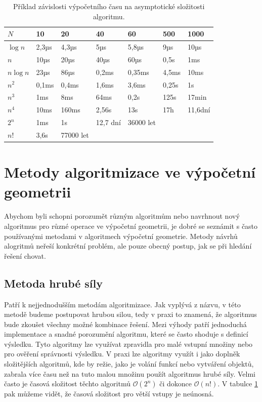 	
\begin{table}

\begin{tabular}{ |p{1.4cm}||p{1.6cm}|p{1.6cm}|p{1.6cm}|p{1.6cm}|p{1.6cm}|p{1.6cm}|  }
\hline

$N$				&10			&20			&40			&60			&500		&1000\\
\hline
$\log n$		&2,3µs		&4,3µs		&5µs		&5,8µs		&9µs		&10µs\\			
$n$				&10µs		&20µs		&40µs		&60µs		&0,5s		&1ms\\
$n \log n$		&23µs		&86µs		&0,2ms		&0,35ms		&4,5ms		&10ms\\
$n^2$			&0,1ms		&0,4ms		&1,6ms		&3,6ms		&0,25s		&1s\\
$n^3$			&1ms		&8ms		&64ms		&0,2s		&125s		&17min\\
$n^4$			&10ms		&160ms		&2,56s		&13s		&17h		&11,6dní\\
$2^n$			&1ms		&1s			&12,7 dní	&36000 let	&			&\\
$n!$			&3,6s		&77000 let	&			&			&			&\\
\hline

\end{tabular}
\caption{Příklad závislosti výpočetního času na asymptotické složitosti algoritmu.}
\label{tab:4-time_complexity}
\end{table}

\section{Metody algoritmizace ve výpočetní geometrii}
Abychom byli schopni porozumět různým algoritmům nebo navrhnout nový
algoritmus pro různé operace ve výpočetní geometrii, je dobré se
seznámit s často používanými metodami v algoritmech výpočetní
geometrie. Metody návrhů alogritmů neřeší konkrétní problém, ale pouze
obecný postup, jak se při hledání řešení chovat.

\subsection{Metoda hrubé síly}
Patří k nejjednodušším metodám algoritmizace. Jak vyplývá z názvu, v
této metodě budeme postupovat hrubou silou, tedy v praxi to znamená,
že algoritmus bude zkou\-šet všechny možné kombinace řešení. Mezi
výhody patří jednoduchá implementace a snadné porozumění algoritmu,
které se často shoduje s definicí výsledku. Tyto algoritmy lze
využívat zpravidla pro malé vstupní množiny nebo pro ověření
správnosti výsledku. V praxi lze algoritmy využít i jako doplněk
složitějších algoritmů, kde by režie, jako je volání funkcí nebo
vytváření objektů, zabrala více času než na tuto malou množinu použít
algoritmus hrubé síly. Velmi často je časová složitost těchto
algoritmů $\mathcal{O}(2^n)$ či dokonce $\mathcal{O}(n!)$. V tabulce
\ref{tab:4-time_complexity} pak můžeme vidět, že časová složitost pro
větší vstupy je neúnosná.
	
